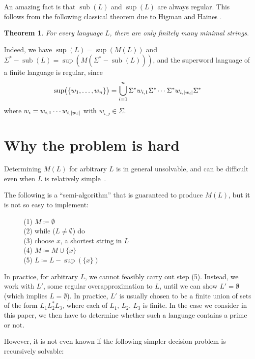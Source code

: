 \documentclass[12pt]{article}
\DeclarePairedDelimiter\abs{\lvert}{\rvert}
\DeclarePairedDelimiter\paren{\lparen}{\rparen}
\DeclareMathOperator\supe{sup}
\DeclareMathOperator\subb{sub}
\theoremstyle{plain}
\newtheorem{theorem}{Theorem}
\theoremstyle{definition}
\newcommand{\0}{\mathtt{0}}
\newcommand{\1}{\mathtt{1}}
\newcommand{\2}{\mathtt{2}}
\newcommand{\3}{\mathtt{3}}
\newcommand{\4}{\mathtt{4}}
\newcommand{\5}{\mathtt{5}}
\newcommand{\6}{\mathtt{6}}
\newcommand{\7}{\mathtt{7}}
\newcommand{\8}{\mathtt{8}}
\newcommand{\9}{\mathtt{9}}
\newcommand{\union}{\cup}
\begin{document}
An amazing fact is that $\subb(L)$ and $\supe(L)$ are always regular.
This follows from
the following classical theorem due to Higman \cite{Hi52} and
Haines \cite{Ha69}.

\begin{theorem}
For every language\/ $L$, there are only finitely many minimal strings.
\end{theorem}

Indeed, we have $\supe(L) = \supe(M(L))$
and $\Sigma^* - \subb(L) = \supe(M(\Sigma^* - \subb(L)))$, and
the superword language of a finite language is regular, since
\[ \supe\paren[\big]{\{w_1,\dotsc,w_n\}} = \bigcup_{i=1}^n \Sigma^* w_{i,1} \Sigma^* \dotsm \Sigma^* w_{i,\abs{w_i}} \Sigma^* \]
where $w_i=w_{i,1}\dotsm w_{i,\abs{w_i}}$ with $w_{i,j}\in\Sigma$.

\section{Why the problem is hard}

Determining $M(L)$ for arbitrary $L$
is in general unsolvable, and can be difficult even when $L$
is relatively simple~\cite{GHK07,GHK09}.

The following is a ``semi-algorithm'' that 
is guaranteed to produce $M(L)$, but it is not so easy to implement:

\begin{figure}[H]
(1) $ M \coloneqq \emptyset$ \\
(2) while ($L \not= \emptyset$) do \\
\hphantom{} \qquad (3) choose $x$, a shortest string in $L$ \\
\hphantom{} \qquad (4) $ M \coloneqq M \union \lbrace  x \rbrace$ \\
\hphantom{} \qquad (5) $ L \coloneqq L - \supe(\lbrace x \rbrace) $
\end{figure}

In practice, for arbitrary $L$,
we cannot feasibly carry out step (5).  Instead, we work
with $L'$, some regular overapproximation to $L$, until we can show $L' =
\emptyset$ (which implies $L = \emptyset$).  In practice,
$L'$ is usually chosen to be a finite union of sets of the form 
$L_1 L_2^* L_3$, where each of $L_1$, $L_2$, $L_3$ is finite.
In the case we consider in this paper,
we then have to determine whether such a language contains
a prime or not.

However, it is not even known if the following simpler decision problem is 
recursively solvable:
\end{document}
